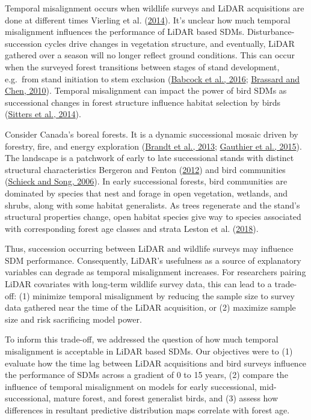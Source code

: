 \documentclass[
]{article}
\begin{document}
Temporal misalignment occurs when wildlife surveys and LiDAR acquisitions are done at different times Vierling et al. (\protect\hyperlink{ref-VierlingSwift2014}{2014}). It's unclear how much temporal misalignment influences the performance of LiDAR based SDMs. Disturbance-succession cycles drive changes in vegetation structure, and eventually, LiDAR gathered over a season will no longer reflect ground conditions. This can occur when the surveyed forest transitions between stages of stand development, e.g.~from stand initiation to stem exclusion (\protect\hyperlink{ref-babcockModelingForestBiomass2016}{Babcock et al., 2016}; \protect\hyperlink{ref-brassardStandStructureComposition2010}{Brassard and Chen, 2010}). Temporal misalignment can impact the power of bird SDMs as successional changes in forest structure influence habitat selection by birds (\protect\hyperlink{ref-sittersAssociationsOccupancyHabitat2014}{Sitters et al., 2014}).

Consider Canada's boreal forests. It is a dynamic successional mosaic driven by forestry, fire, and energy exploration (\protect\hyperlink{ref-Brandt2013}{Brandt et al., 2013}; \protect\hyperlink{ref-gauthierBorealForestHealth2015}{Gauthier et al., 2015}). The landscape is a patchwork of early to late successional stands with distinct structural characteristics Bergeron and Fenton (\protect\hyperlink{ref-Bergeron2012}{2012}) and bird communities (\protect\hyperlink{ref-Schieck2006}{Schieck and Song, 2006}). In early successional forests, bird communities are dominated by species that nest and forage in open vegetation, wetlands, and shrubs, along with some habitat generalists. As trees regenerate and the stand's structural properties change, open habitat species give way to species associated with corresponding forest age classes and strata Leston et al. (\protect\hyperlink{ref-lestonLongtermChangesBoreal2018}{2018}).

Thus, succession occurring between LiDAR and wildlife surveys may influence SDM performance. Consequently, LiDAR's usefulness as a source of explanatory variables can degrade as temporal misalignment increases. For researchers pairing LiDAR covariates with long-term wildlife survey data, this can lead to a trade-off: (1) minimize temporal misalignment by reducing the sample size to survey data gathered near the time of the LiDAR acquisition, or (2) maximize sample size and risk sacrificing model power.

To inform this trade-off, we addressed the question of how much temporal misalignment is acceptable in LiDAR based SDMs. Our objectives were to (1) evaluate how the time lag between LiDAR acquisitions and bird surveys influence the performance of SDMs across a gradient of 0 to 15 years, (2) compare the influence of temporal misalignment on models for early successional, mid-successional, mature forest, and forest generalist birds, and (3) assess how differences in resultant predictive distribution maps correlate with forest age.
\end{document}
